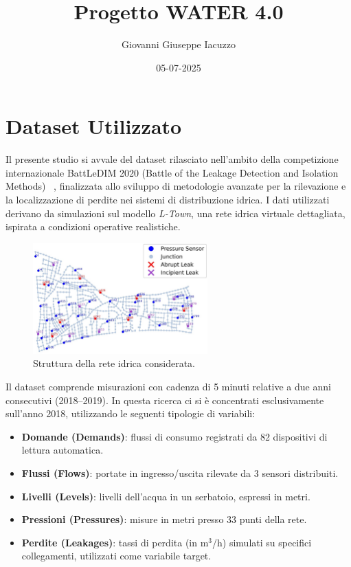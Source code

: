 \documentclass{article}
\title{Progetto WATER 4.0}
\author{Giovanni Giuseppe Iacuzzo}
\date{05-07-2025}
\begin{document}
\sloppy
\maketitle

\section{Dataset Utilizzato}

Il presente studio si avvale del dataset rilasciato nell'ambito della competizione internazionale 
BattLeDIM 2020 (Battle of the Leakage Detection and Isolation Methods) ~\cite{battle2020}, finalizzata allo 
sviluppo di metodologie avanzate per la rilevazione e la localizzazione di perdite nei sistemi di distribuzione 
idrica. I dati utilizzati derivano da simulazioni sul modello \emph{L-Town}, una rete idrica virtuale dettagliata, 
ispirata a condizioni operative realistiche.

\begin{figure}[htbp]
    \centering
    \includegraphics[width=0.6\textwidth]{img/struttura della rete.png}
    \caption{Struttura della rete idrica considerata.}
    \label{fig:network_structure}
\end{figure}

Il dataset comprende misurazioni con cadenza di 5 minuti relative a due anni consecutivi (2018--2019). 
In questa ricerca ci si è concentrati esclusivamente sull'anno 2018, utilizzando le seguenti tipologie 
di variabili:
\begin{itemize}
    \item \textbf{Domande (Demands)}: flussi di consumo registrati da 82 dispositivi di lettura automatica.
    \item \textbf{Flussi (Flows)}: portate in ingresso/uscita rilevate da 3 sensori distribuiti.
    \item \textbf{Livelli (Levels)}: livelli dell’acqua in un serbatoio, espressi in metri.
    \item \textbf{Pressioni (Pressures)}: misure in metri presso 33 punti della rete.
    \item \textbf{Perdite (Leakages)}: tassi di perdita (in m$^3$/h) simulati su specifici collegamenti, utilizzati come variabile target.
\end{itemize}
\end{document}
